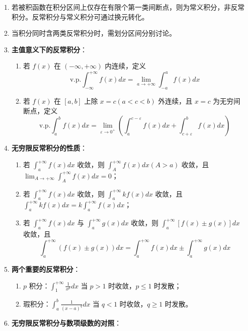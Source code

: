\documentclass[UTF8]{ctexart}
\theoremstyle{remark}
\begin{document}
\begin{enumerate}
	\item 若被积函数在积分区间上仅存在有限个第一类间断点，则为常义积分，非反常积分。反常积分与常义积分可通过换元转化。
	
	\item 当积分同时含两类反常积分时，需划分区间分别讨论。
	
	\item \textbf{主值意义下的反常积分}：
	\begin{enumerate}
		\item 若 \(f(x)\) 在 \((-\infty, +\infty)\) 内连续，定义
		\[
		\text{v.p.} \int_{-\infty}^{+\infty} f(x) dx = \lim_{a \to +\infty} \int_{-a}^{a} f(x) dx
		\]
		\item 若 \(f(x)\) 在 \([a, b]\) 上除 \(x = c(a < c < b)\) 外连续，且 \(x = c\) 为无穷间断点，定义
		\[
		\text{v.p.} \int_{a}^{b} f(x) dx = \lim_{\varepsilon \to 0^{+}} \left( \int_{a}^{c-\varepsilon} f(x) dx + \int_{c+\varepsilon}^{b} f(x) dx \right)
		\]
	\end{enumerate}
	
	\item \textbf{无穷限反常积分的性质}：
	\begin{enumerate}
		\item 若 \(\int_{a}^{+\infty} f(x) dx\) 收敛，则 \(\int_{A}^{+\infty} f(x) dx (A > a)\) 收敛，且 \(\lim_{A \to +\infty} \int_{A}^{+\infty} f(x) dx = 0\)；
		\item 若 \(\int_{a}^{+\infty} f(x) dx\) 收敛，则 \(\int_{a}^{+\infty} kf(x) dx\) 收敛，且 \(\int_{a}^{+\infty} kf(x) dx = k \int_{a}^{+\infty} f(x) dx\)；
		\item 若 \(\int_{a}^{+\infty} f(x) dx\) 与 \(\int_{a}^{+\infty} g(x) dx\) 收敛，则 \(\int_{a}^{+\infty} [f(x) \pm g(x)] dx\) 收敛，且
		\[
		\int_{a}^{+\infty} (f(x) \pm g(x)) dx = \int_{a}^{+\infty} f(x) dx \pm \int_{a}^{+\infty} g(x) dx
		\]
	\end{enumerate}
	
	\item \textbf{两个重要的反常积分}：
	\begin{enumerate}
		\item \(p\) 积分：\(\int_{1}^{+\infty} \frac{1}{x^p} dx\) 当 \(p > 1\) 时收敛，\(p \leq 1\) 时发散；
		\item 瑕积分：\(\int_{a}^{b} \frac{1}{(x-a)^q} dx\) 当 \(q < 1\) 时收敛，\(q \geq 1\) 时发散。
	\end{enumerate}
	
	\item \textbf{无穷限反常积分与数项级数的对照}：
	

\end{enumerate}
\end{document}
